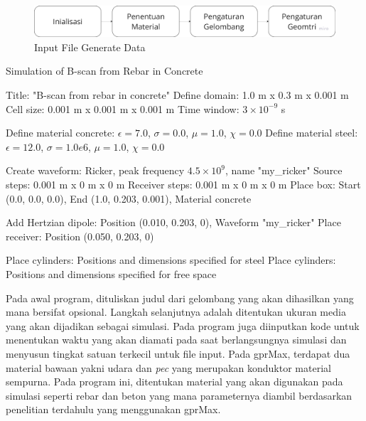 \begin{minipage}{\linewidth}
  \begin{figure} [H] \centering
    \includegraphics[scale=0.1]{gambar/bab3/generateflow.png}
    \caption{Input File Generate Data}
    \label{fig:generateflow}
  \end{figure}
\end{minipage}

\begin{algorithm}
  \caption{Simulation of B-scan from Rebar in Concrete}
  \begin{algorithmic}[1]
      \State Title: "B-scan from rebar in concrete"
      \State Define domain: 1.0 m x 0.3 m x 0.001 m
      \State Cell size: 0.001 m x 0.001 m x 0.001 m
      \State Time window: $3 \times 10^{-9}$ s
      
      \State Define material concrete: $\epsilon=7.0$, $\sigma=0.0$, $\mu=1.0$, $\chi=0.0$
      \State Define material steel: $\epsilon=12.0$, $\sigma=1.0e6$, $\mu=1.0$, $\chi=0.0$
      
      \State Create waveform: Ricker, peak frequency $4.5 \times 10^9$, name "my\_ricker"
      \State Source steps: 0.001 m x 0 m x 0 m
      \State Receiver steps: 0.001 m x 0 m x 0 m
      \State Place box: Start (0.0, 0.0, 0.0), End (1.0, 0.203, 0.001), Material concrete
      
      \State Add Hertzian dipole: Position (0.010, 0.203, 0), Waveform "my\_ricker"
      \State Place receiver: Position (0.050, 0.203, 0)
      
      \State Place cylinders: Positions and dimensions specified for steel
      \State Place cylinders: Positions and dimensions specified for free space
  \end{algorithmic}
\end{algorithm}

Pada awal program, dituliskan judul dari gelombang yang akan dihasilkan yang mana bersifat opsional. Langkah selanjutnya adalah ditentukan ukuran media yang akan dijadikan sebagai simulasi. Pada program juga diinputkan kode untuk menentukan waktu yang akan diamati pada saat berlangsungnya simulasi dan menyusun tingkat satuan terkecil untuk file input. Pada gprMax, terdapat dua material bawaan yakni udara dan \emph{pec} yang merupakan konduktor material sempurna. Pada program ini, ditentukan material yang akan digunakan pada simulasi seperti rebar dan beton yang mana parameternya diambil berdasarkan penelitian terdahulu yang menggunakan gprMax.

